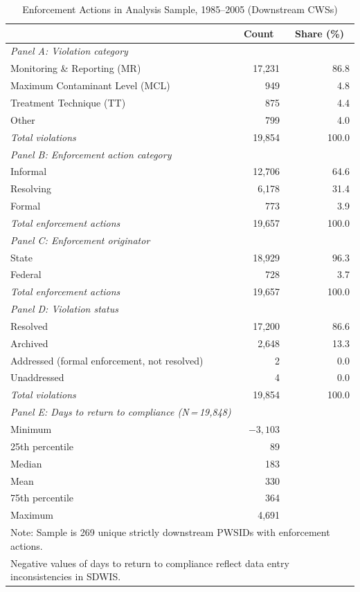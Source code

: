 \begin{table}[h!]
\centering
\caption{Enforcement Actions in Analysis Sample, 1985--2005 (Downstream CWSs)}
\label{tab:enforcement_profile}
\small
\begin{tabular}{lrr}
\hline\hline
 & \multicolumn{1}{c}{Count} & \multicolumn{1}{c}{Share (\%)} \\
\hline
\multicolumn{3}{l}{\textit{Panel A: Violation category}} \\
Monitoring \& Reporting (MR) & 17,231 & 86.8 \\
Maximum Contaminant Level (MCL) & 949 & 4.8 \\
Treatment Technique (TT) & 875 & 4.4 \\
Other & 799 & 4.0 \\
\hline
\textit{Total violations} & 19,854 & 100.0 \\[6pt]
\multicolumn{3}{l}{\textit{Panel B: Enforcement action category}} \\
Informal & 12,706 & 64.6 \\
Resolving & 6,178 & 31.4 \\
Formal & 773 & 3.9 \\
\hline
\textit{Total enforcement actions} & 19,657 & 100.0 \\[6pt]
\multicolumn{3}{l}{\textit{Panel C: Enforcement originator}} \\
State & 18,929 & 96.3 \\
Federal & 728 & 3.7 \\
\hline
\textit{Total enforcement actions} & 19,657 & 100.0 \\[6pt]
\multicolumn{3}{l}{\textit{Panel D: Violation status}} \\
Resolved & 17,200 & 86.6 \\
Archived & 2,648 & 13.3 \\
Addressed (formal enforcement, not resolved) & 2 & 0.0 \\
Unaddressed & 4 & 0.0 \\
\hline
\textit{Total violations} & 19,854 & 100.0 \\[6pt]
\multicolumn{3}{l}{\textit{Panel E: Days to return to compliance (N\,=\,19,848)}} \\
Minimum & $-3,103$ & \\
25th percentile & 89 & \\
Median & 183 & \\
Mean & 330 & \\
75th percentile & 364 & \\
Maximum & 4,691 & \\
\hline\hline
\multicolumn{3}{l}{\footnotesize Note: Sample is 269 unique strictly downstream PWSIDs with enforcement actions.} \\
\multicolumn{3}{l}{\footnotesize Negative values of days to return to compliance reflect data entry inconsistencies in SDWIS.} \\
\end{tabular}
\end{table}
